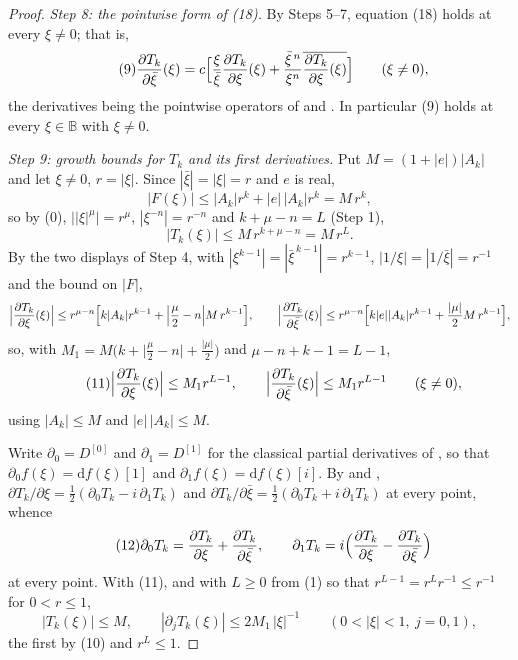 \begin{proof}
\emph{Step 8: the pointwise form of (18).}  By Steps 5--7, equation (18) holds
at every $\xi\neq0$; that is,
\begin{equation}\tag{9}
  \frac{\partial T_k}{\partial\bar\xi}(\xi)
  =c\Bigl[\frac{\xi}{\bar\xi}\frac{\partial T_k}{\partial\xi}(\xi)
    +\frac{\bar\xi^{\,n}}{\xi^{n}}
      \overline{\frac{\partial T_k}{\partial\xi}(\xi)}\Bigr]
  \qquad(\xi\neq0),
\end{equation}
the derivatives being the pointwise operators of  and
.  In particular (9) holds at every $\xi\in\mathbb{B}$ with
$\xi\neq0$.

\emph{Step 9: growth bounds for $T_k$ and its first derivatives.}  Put
$M=(1+|e|)|A_k|$ and let $\xi\neq0$, $r=|\xi|$.  Since $|\bar\xi|=|\xi|=r$ and
$e$ is real,
\[
  |F(\xi)|\le|A_k|r^{k}+|e|\,|A_k|r^{k}=M\,r^{k},
\]
so by (0), $\bigl||\xi|^{\mu}\bigr|=r^{\mu}$, $|\xi^{-n}|=r^{-n}$ and
$k+\mu-n=L$ (Step 1),
\begin{equation}\tag{10}
  |T_k(\xi)|\le M\,r^{k+\mu-n}=M\,r^{L}.
\end{equation}
By the two displays of Step 4, with $|\xi^{k-1}|=|\bar\xi^{\,k-1}|=r^{k-1}$,
$|1/\xi|=|1/\bar\xi|=r^{-1}$ and the bound on $|F|$,
\[
  \Bigl|\frac{\partial T_k}{\partial\xi}(\xi)\Bigr|
  \le r^{\mu-n}\Bigl[k|A_k|r^{k-1}
    +\Bigl|\frac{\mu}{2}-n\Bigr|M\,r^{k-1}\Bigr],
  \qquad
  \Bigl|\frac{\partial T_k}{\partial\bar\xi}(\xi)\Bigr|
  \le r^{\mu-n}\Bigl[k|e||A_k|r^{k-1}
    +\frac{|\mu|}{2}M\,r^{k-1}\Bigr],
\]
so, with $M_1=M\bigl(k+\bigl|\tfrac{\mu}{2}-n\bigr|+\tfrac{|\mu|}{2}\bigr)$ and
$\mu-n+k-1=L-1$,
\begin{equation}\tag{11}
  \Bigl|\frac{\partial T_k}{\partial\xi}(\xi)\Bigr|\le M_1r^{L-1},
  \qquad
  \Bigl|\frac{\partial T_k}{\partial\bar\xi}(\xi)\Bigr|\le M_1r^{L-1}
  \qquad(\xi\neq0),
\end{equation}
using $|A_k|\le M$ and $|e|\,|A_k|\le M$.

Write $\partial_0=D^{[0]}$ and $\partial_1=D^{[1]}$ for the classical partial
derivatives of , so that
$\partial_0f(\xi)=\mathrm{d}f(\xi)[1]$ and $\partial_1f(\xi)=\mathrm{d}f(\xi)[i]$.
By  and ,
$\partial T_k/\partial\xi=\tfrac12(\partial_0T_k-i\,\partial_1T_k)$ and
$\partial T_k/\partial\bar\xi=\tfrac12(\partial_0T_k+i\,\partial_1T_k)$ at
every point, whence
\begin{equation}\tag{12}
  \partial_0T_k=\frac{\partial T_k}{\partial\xi}
    +\frac{\partial T_k}{\partial\bar\xi},
  \qquad
  \partial_1T_k=i\Bigl(\frac{\partial T_k}{\partial\xi}
    -\frac{\partial T_k}{\partial\bar\xi}\Bigr)
\end{equation}
at every point.  With (11), and with $L\ge0$ from (1) so that
$r^{L-1}=r^{L}r^{-1}\le r^{-1}$ for $0<r\le1$,
\begin{equation}\tag{13}
  |T_k(\xi)|\le M,\qquad |\partial_jT_k(\xi)|\le2M_1\,|\xi|^{-1}
  \qquad(0<|\xi|<1,\ j=0,1),
\end{equation}
the first by (10) and $r^{L}\le1$.


\end{proof}

